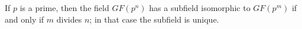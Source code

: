 If $p$ is a prime, then the field $GF(p^n)$ has a subfield isomorphic to $GF(p^m)$ if and only if $m$ divides $n$; in that case the subfield is unique.
